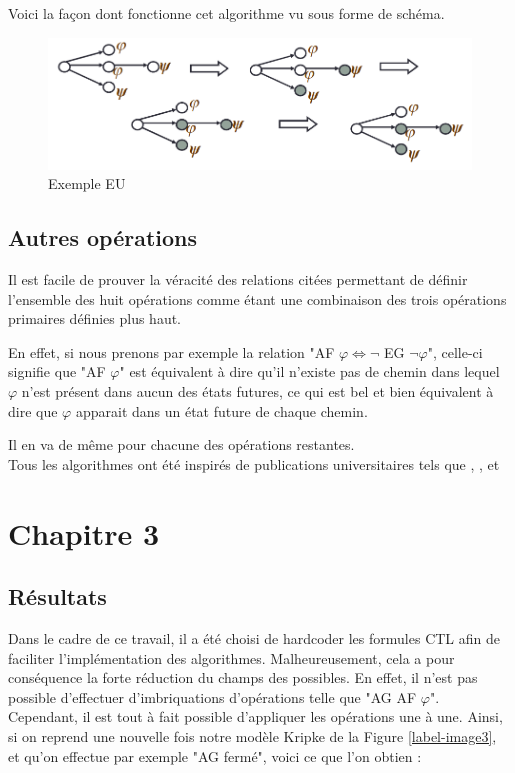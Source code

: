 \documentclass[runningheads,a4paper]{llncs}
\begin{document}
Voici la façon dont fonctionne cet algorithme vu sous forme de schéma.

\begin{figure}[!h]
	\includegraphics[scale=0.5]{EU.png}
	\centering
	\caption{Exemple EU}
	\label{label-image8}
\end{figure}

\subsection{Autres opérations}

Il est facile de prouver la véracité des relations citées permettant de définir l'ensemble des huit opérations comme étant une combinaison des trois opérations primaires définies plus haut.

\noindent En effet, si nous prenons par exemple la relation "AF $\varphi \Leftrightarrow \lnot$ EG $\lnot \varphi$", celle-ci signifie que "AF $\varphi$" est équivalent à dire qu'il n'existe pas de chemin dans lequel $\varphi$ n'est présent dans aucun des états futures, ce qui est bel et bien équivalent à dire que $\varphi$ apparait dans un état future de chaque chemin.

\noindent Il en va de même pour chacune des opérations restantes. \\ 

\noindent Tous les algorithmes ont été inspirés de publications universitaires tels que \cite{LectureA}, \cite{LectureB}, \cite{LectureC} et \cite{LectureD}

\section{Chapitre 3}
\subsection{Résultats}
Dans le cadre de ce travail, il a été choisi de hardcoder les formules CTL afin de faciliter l'implémentation des algorithmes. Malheureusement, cela a pour conséquence la forte réduction du champs des possibles. En effet, il n'est pas possible d'effectuer d'imbriquations d'opérations telle que "AG AF $\varphi$". \\
\noindent Cependant, il est tout à fait possible d'appliquer les opérations une à une. Ainsi, si on reprend une nouvelle fois notre modèle Kripke de la Figure \ref{label-image3}, et qu'on effectue par exemple "AG fermé", voici ce que l'on obtien : 
\end{document}
